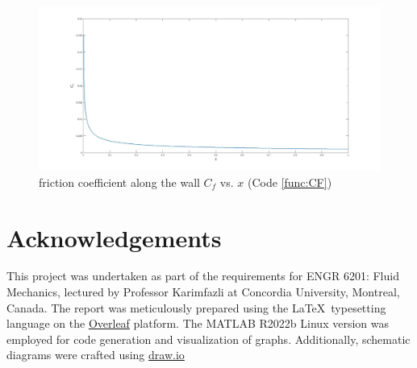 \documentclass[]{report}
\begin{document}
\begin{figure}
    \centering
    \includegraphics[width=\linewidth]{cf.jpg}
    \caption{ friction coefficient along the wall $C_f$ vs. $x$ (Code \ref{func:CF})}
    \label{fig:cf}
\end{figure}

\newpage
\chapter*{Acknowledgements}

This project was undertaken as part of the requirements for ENGR 6201: Fluid Mechanics, lectured by Professor Karimfazli at Concordia University, Montreal, Canada. The report was meticulously prepared using the \LaTeX\ typesetting language on the \href{https://www.overleaf.com/}{Overleaf} platform. The MATLAB\cite{MATLAB} R2022b Linux version was employed for code generation and visualization of graphs. Additionally, schematic diagrams were crafted using \href{https://app.diagrams.net/}{draw.io}

\end{document}

